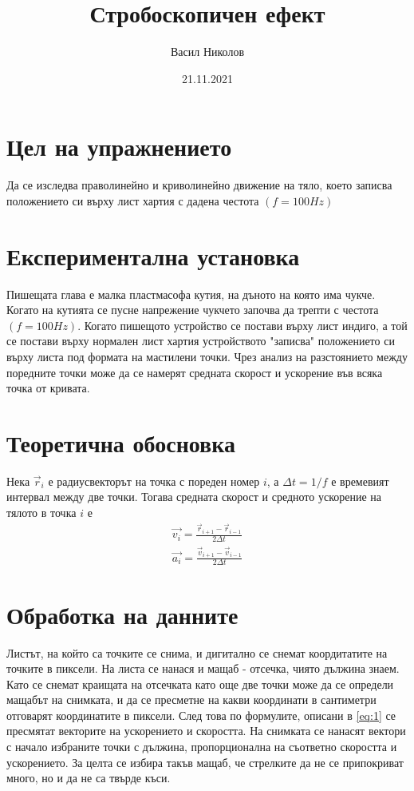 \documentclass[aps, prb, twocolumn, a4paper, floatfix, reprint]{revtex4-2}
\begin{document}
\title{Стробоскопичен ефект}
\author{Васил Николов}
\noaffiliation
\date{21.11.2021}
\maketitle

\section{Цел на упражнението}
Да се изследва праволинейно и криволинейно движение на тяло, което записва положението си върху лист хартия с дадена честота $(f=100Hz)$

\section{Експериментална установка}
Пишещата глава е малка пластмасофа кутия, на дъното на която има чукче. Когато на кутията се пусне напрежение чукчето започва да трепти с честота $(f=100Hz)$. Когато пишещото устройство се постави върху лист индиго, а той се постави върху нормален лист хартия устройството "записва" положението си върху листа под формата на мастилени точки. Чрез анализ на разстоянието между поредните точки може да се намерят средната скорост и ускорение във всяка точка от кривата. 

\section{Теоретична обосновка}
Нека $\vec{r}_i$ е радиусвекторът на точка с пореден номер $i$, а $\Delta t = 1/f$ е времевият интервал между две точки. Тогава средната скорост и средното ускорение на тялото в точка $i$ е 
\begin{subequations} \label{eq:1} 
\begin{gather} 
    \vec{v_i} = \frac{\vec{r}_{i + 1} - \vec{r}_{i - 1}}{2\Delta t} \\
    \vec{a_i} = \frac{\vec{v}_{i + 1} - \vec{v}_{i - 1}}{2\Delta t} 
\end{gather}
\end{subequations}

\section{Обработка на данните}
Листът, на който са точките се снима, и дигитално се снемат коордитатите на точките в пиксели. На листа се нанася и мащаб - отсечка, чиято дължина знаем. Като се снемат краищата на отсечката като още две точки може да се определи мащабът на снимката, и да се пресметне на какви координати в сантиметри отговарят координатите в пиксели. След това по формулите, описани в \eqref{eq:1} се пресмятат векторите на ускорението и скоростта. На снимката се нанасят вектори с начало избраните точки с дължина, пропорционална на съответно скоростта и ускорението. За целта се избира такъв мащаб, че стрелките да не се припокриват много, но и да не са твърде къси. 
\end{document}
